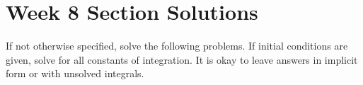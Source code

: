 \documentclass[letterpaper, fontsize=11pt]{scrartcl} %
\numberwithin{equation}{section} %
\numberwithin{figure}{section} %
\numberwithin{table}{section} %
\begin{document}

\newcommand{\horrule}[1]{\rule{\linewidth}{#1}} %


\section*{Week 8 Section Solutions}
\par If not otherwise specified, solve the following problems. If initial conditions are given, solve for all constants of integration. It is okay to leave answers in implicit form or with unsolved integrals. 
\end{document}
